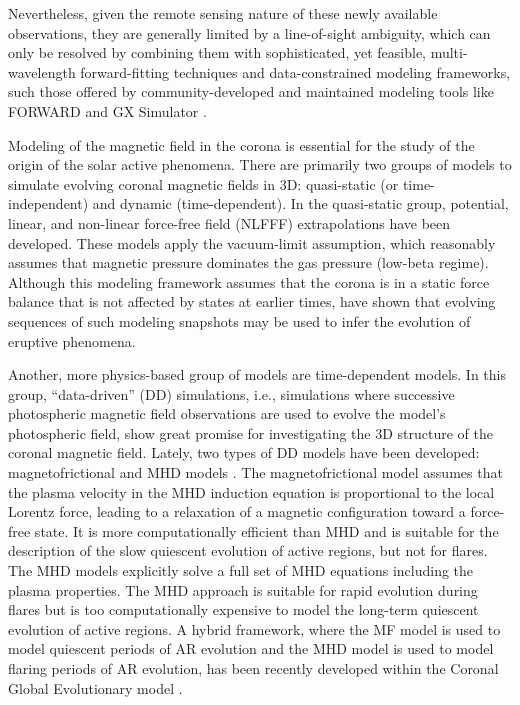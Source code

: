 \documentclass[]{article}
\begin{document}
Nevertheless, given the remote sensing nature of these newly available observations, they are generally limited by a line-of-sight ambiguity, which can only be resolved by combining them with sophisticated, yet feasible, multi-wavelength forward-fitting techniques and data-constrained modeling frameworks, such those offered by community-developed and maintained modeling tools like FORWARD \citep{Gibson2016} and GX Simulator \citep{Nita2015, Nita2018}.

Modeling of the magnetic field in the corona is essential for the study of the origin of  the solar active phenomena. There are primarily two groups of models to simulate evolving coronal magnetic fields in 3D: quasi-static (or time-independent) and dynamic (time-dependent). In the quasi-static group, potential, linear, and non-linear force-free field (NLFFF) extrapolations have been developed. These models apply the vacuum-limit assumption, which reasonably assumes that magnetic pressure dominates the gas pressure (low-beta regime). Although this modeling framework assumes that the corona is in a static force balance that is not affected by states at earlier times,  \citet{Fleishman2018} have shown that evolving sequences of such modeling snapshots may be used to infer the evolution of eruptive phenomena.

Another, more physics-based group of models are time-dependent models. In this group,  ``data-driven'' (DD) simulations, i.e., simulations where successive photospheric magnetic field observations are used to evolve the model's photospheric field, show great promise for investigating the 3D structure of the coronal magnetic field. Lately, two types of DD models have been developed: magnetofrictional \citep[e.g.][]{Cheung2012} and MHD models \citep[e.g.][]{Hayashi2018}. The magnetofrictional model assumes that the plasma velocity in the MHD induction equation is proportional to the local Lorentz force, leading to a relaxation of a magnetic configuration toward a force-free state. It is more computationally efficient than MHD and is suitable for the description of the slow quiescent evolution of active regions, but not for flares. The MHD models explicitly solve a full set of MHD equations including the plasma properties. The MHD approach is suitable for rapid evolution during flares but is too computationally expensive to model the long-term quiescent evolution of active regions. A hybrid framework, where the MF model is used to model quiescent periods of AR evolution and the MHD model is used to model flaring periods of AR evolution, has been recently developed within the Coronal Global Evolutionary model \citep{Hoeksema2020}.
\end{document}
